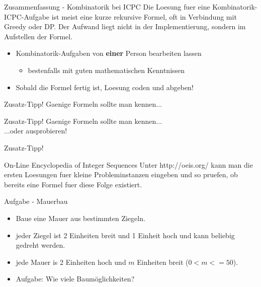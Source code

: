 \documentclass[18pt]{beamer}
\begin{document}
\begin{frame}{Zusammenfassung - Kombinatorik bei ICPC}
Die Loesung fuer eine Kombinatorik-ICPC-Aufgabe ist meist eine kurze rekursive Formel, oft in Verbindung mit Greedy oder DP. Der Aufwand liegt nicht in der Implementierung, sondern im Aufstellen der Formel.
\pause
\begin{itemize}
\item Kombinatorik-Aufgaben von \textbf{einer} Person bearbeiten lassen
\pause
\begin{itemize}
\item bestenfalls mit guten mathematischen Kenntnissen
\end{itemize}
\pause
\item Sobald die Formel fertig ist, Loesung coden und abgeben!
\end{itemize}
\end{frame}

\begin{frame}{Zusatz-Tipp!}
Gaenige Formeln sollte man kennen... \\

\end{frame}

\begin{frame}{Zusatz-Tipp!}
Gaenige Formeln sollte man kennen... \\



...oder ausprobieren! \\

\end{frame}

\begin{frame}{Zusatz-Tipp!}
\begin{block}{On-Line Encyclopedia of Integer Sequences}
Unter http://oeis.org/ kann man die ersten Loesungen fuer kleine Probleminstanzen eingeben und so pruefen, ob bereits eine Formel fuer diese Folge existiert.
\end{block}

\end{frame}

\begin{frame}{Aufgabe - Mauerbau}
\begin{itemize}
\item Baue eine Mauer aus bestimmten Ziegeln.
\item jeder Ziegel ist 2 Einheiten breit und 1 Einheit hoch und kann beliebig gedreht werden.
\item jede Mauer is 2 Einheiten hoch und \(m\) Einheiten breit (\(0<m<=50\)). 
\item Aufgabe: Wie viele Baumöglichkeiten?
\end{itemize}
\end{frame}
\end{document}

